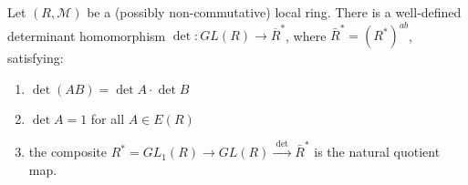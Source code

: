 \begin{theo}
Let $(R, \mathcal{M})$ be a (possibly non-commutative) local ring. There is a well-defined determinant homomorphism $\det: GL(R) \rightarrow \overline{R}^*$, where $\bar{R}^*=\left(R^*\right)^{a b}$, satisfying:

\begin{enumerate}
    \item $\operatorname{det}(A B)=\operatorname{det} A \cdot \operatorname{det} B$
    \item $\operatorname{det} A=1$ for all $A \in E(R)$
    \item the composite $R^*=G L_1(R) \longrightarrow G L(R) \xrightarrow{\text { det }} \bar{R}^*$ is the natural quotient map.
\end{enumerate}

\end{theo}






